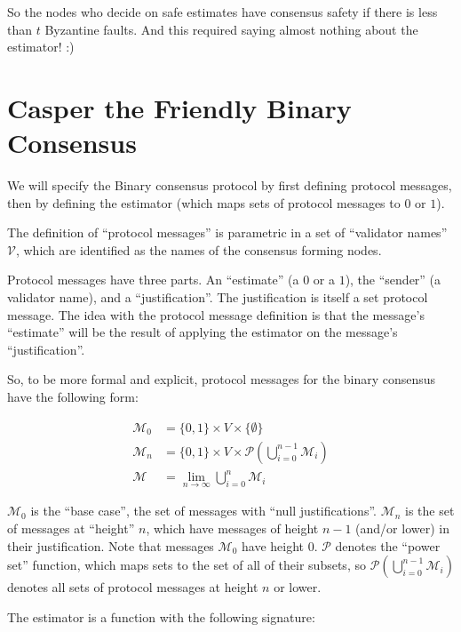 \documentclass{article}
\theoremstyle{definition}
\begin{document}
So the nodes who decide on safe estimates have consensus safety if there is less than $t$ Byzantine faults. And this required saying almost nothing about the estimator! :)


\section{Casper the Friendly Binary Consensus}

We will specify the Binary consensus protocol by first defining protocol messages, then by defining the estimator (which maps sets of protocol messages to $0$ or $1$). 

The definition of ``protocol messages'' is parametric in a set of ``validator names'' $\mathcal{V}$, which are identified as the names of the consensus forming nodes.

Protocol messages have three parts. An ``estimate'' (a $0$ or a $1$), the ``sender'' (a validator name), and a ``justification''. The justification is itself a set protocol message. The idea with the protocol message definition is that the message's ``estimate'' will be the result of applying the estimator on the message's ``justification''.

So, to be more formal and explicit, protocol messages for the binary consensus have the following form:

\begin{equation}
\begin{split}
    \mathcal{M}_0 &= \{0, 1\} \times V \times \{\emptyset\}\\
    \mathcal{M}_n &= \{0, 1\} \times V \times \mathcal{P}(\bigcup_{i=0}^{n-1} \mathcal{M}_i)\\
    \mathcal{M} &= \lim_{n \to \infty} \bigcup_{i=0}^{n} \mathcal{M}_i
\end{split}
\end{equation}

$\mathcal{M}_0$ is the ``base case'', the set of messages with ``null justifications''. $\mathcal{M}_n$ is the set of messages at ``height'' $n$, which have messages of height $n-1$ (and/or lower) in their justification. Note that messages $\mathcal{M}_0$ have height $0$. $\mathcal{P}$ denotes the ``power set'' function, which maps sets to the set of all of their subsets, so $\mathcal{P}(\bigcup_{i=0}^{n-1} \mathcal{M}_i)$ denotes all sets of protocol messages at height $n$ or lower.  
	
The estimator is a function with the following signature:
	
\end{document}
